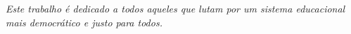 \begin{dedicatoria}
   \vspace*{\fill}
   \centering
   \noindent
   \textit{ Este trabalho é dedicado a todos aqueles que lutam por um sistema educacional mais democrático e justo para todos.} 

   
   \vspace*{\fill}
   

\end{dedicatoria}
